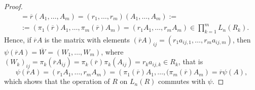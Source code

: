 \documentclass{article}
\begin{document}
\begin{proof}
\begin{align*}
&=\overline{r}\left(A_1,\dots,A_m\right)=\left(r_1,\dots,r_m\right)\left(A_1,\dots,A_m\right):=\\
&:=\left(\pi_1(\overline{r})A_1,\dots,\pi_m(\overline{r})A_m\right)=\left(r_1A_1,\dots,r_mA_m\right)\in\prod_{k=1}^mL_n(R_k).
\end{align*}
Hence, if $\overline{r}A$ is the matrix with elements $(\overline{r}A)_{ij}=\left(r_1a_{ij,1},\dots,r_ma_{ij,m}\right)$, then $\psi(\overline{r}A)=\overline{W}=\left(W_1,\dots,W_m\right)$, where $(W_k)_{ij}=\pi_k(\overline{r}A_{ij})=\pi_k(\overline{r})\pi_k(A_{ij})=r_ka_{ij,k}\in{R}_k$,
that is \[\psi(\overline{r}A)=\left(r_1A_1,\dots,r_mA_m\right)=\left(\pi_1(\overline{r})A_1,\dots,(\pi_m(\overline{r})A_m\right)=\overline{r}\psi(A),\]
which shows that the operation of $R$ on $L_n(R)$ commutes with $\psi$.
\end{proof}
\end{document}

